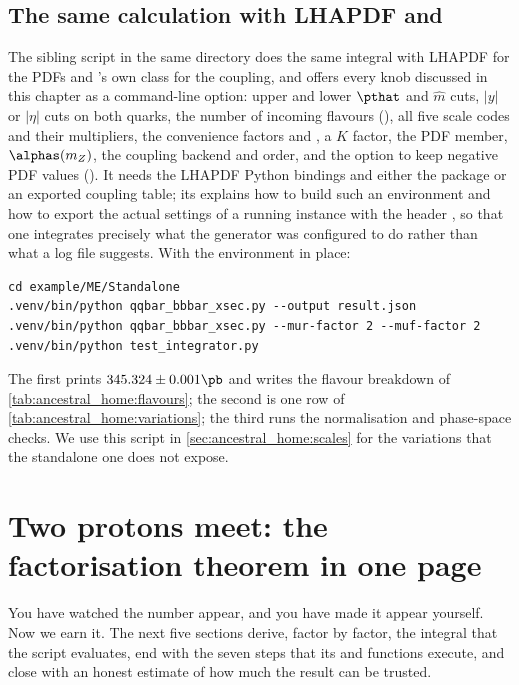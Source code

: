 \subsection{The same calculation with LHAPDF and \PYTHIA}

The sibling script  in the same directory does the
same integral with LHAPDF for the PDFs and \PYTHIA's own 
class for the coupling, and offers every knob discussed in this chapter as a
command-line option: upper and lower $\pthat$ and $\hat m$ cuts, $|y|$ or
$|\eta|$ cuts on both quarks, the number of incoming flavours
(), all five \PYTHIA scale codes and their multipliers, the
convenience factors  and , a $K$ factor,
the PDF member, $\alphas(m_Z)$, the coupling backend and order, and the
option to keep negative PDF values (). It needs the
LHAPDF Python bindings and either the  package or an exported
coupling table; its  explains how to build such an environment
and how to export the actual settings of a running \PYTHIA instance with the
header , so that one integrates precisely what the
generator was configured to do rather than what a log file suggests. With
the environment in place:
\begin{verbatim}
cd example/ME/Standalone
.venv/bin/python qqbar_bbbar_xsec.py --output result.json
.venv/bin/python qqbar_bbbar_xsec.py --mur-factor 2 --muf-factor 2
.venv/bin/python test_integrator.py
\end{verbatim}
The first prints $345.324\pm0.001\pb$ and writes the flavour breakdown of
\cref{tab:ancestral_home:flavours}; the second is one row of
\cref{tab:ancestral_home:variations}; the third runs the normalisation and
phase-space checks. We use this script in \cref{sec:ancestral_home:scales}
for the variations that the standalone one does not expose.

\section{Two protons meet: the factorisation theorem in one page}
\label{sec:ancestral_home:two_protons_meet}

You have watched the number appear, and you have made it appear yourself.
Now we earn it. The next five sections derive, factor by factor, the
integral that the script evaluates, end with the seven steps that its
 and  functions execute, and close with
an honest estimate of how much the result can be trusted.

